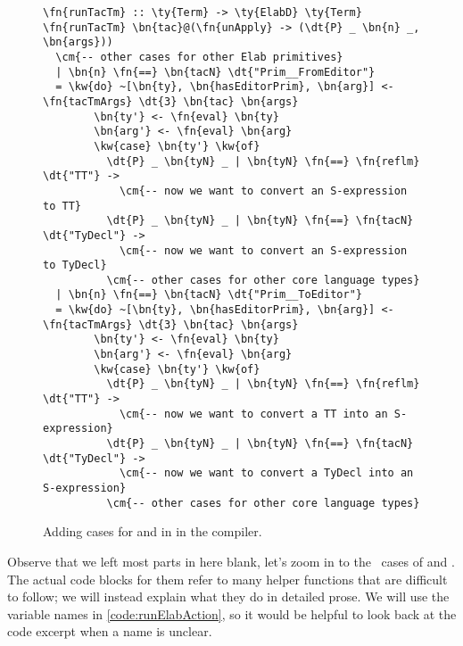 \begin{figure}[H]
\caption{Adding cases for  and  in  in the compiler.}
\label{code:runElabAction}
\begin{Verbatim}[framesep=2mm, label=\footnotesize{\normalfont{Haskell}}, labelposition=topline]
\fn{runTacTm} :: \ty{Term} -> \ty{ElabD} \ty{Term}
\fn{runTacTm} \bn{tac}@(\fn{unApply} -> (\dt{P} _ \bn{n} _, \bn{args}))
  \cm{-- other cases for other Elab primitives}
  | \bn{n} \fn{==} \bn{tacN} \dt{"Prim__FromEditor"}
  = \kw{do} ~[\bn{ty}, \bn{hasEditorPrim}, \bn{arg}] <- \fn{tacTmArgs} \dt{3} \bn{tac} \bn{args}
        \bn{ty'} <- \fn{eval} \bn{ty}
        \bn{arg'} <- \fn{eval} \bn{arg}
        \kw{case} \bn{ty'} \kw{of}
          \dt{P} _ \bn{tyN} _ | \bn{tyN} \fn{==} \fn{reflm} \dt{"TT"} ->
            \cm{-- now we want to convert an S-expression to TT}
          \dt{P} _ \bn{tyN} _ | \bn{tyN} \fn{==} \fn{tacN} \dt{"TyDecl"} ->
            \cm{-- now we want to convert an S-expression to TyDecl}
          \cm{-- other cases for other core language types}
  | \bn{n} \fn{==} \bn{tacN} \dt{"Prim__ToEditor"}
  = \kw{do} ~[\bn{ty}, \bn{hasEditorPrim}, \bn{arg}] <- \fn{tacTmArgs} \dt{3} \bn{tac} \bn{args}
        \bn{ty'} <- \fn{eval} \bn{ty}
        \bn{arg'} <- \fn{eval} \bn{arg}
        \kw{case} \bn{ty'} \kw{of}
          \dt{P} _ \bn{tyN} _ | \bn{tyN} \fn{==} \fn{reflm} \dt{"TT"} ->
            \cm{-- now we want to convert a TT into an S-expression}
          \dt{P} _ \bn{tyN} _ | \bn{tyN} \fn{==} \fn{tacN} \dt{"TyDecl"} ->
            \cm{-- now we want to convert a TyDecl into an S-expression}
          \cm{-- other cases for other core language types}
\end{Verbatim}
\end{figure}

Observe that we left most parts in here blank, let's zoom in to the \TT\ cases
  of  and . The actual code blocks
  for them refer to many helper functions that are difficult to follow; we will
  instead explain what they do in detailed prose. We will use the variable
  names in \autoref{code:runElabAction}, so it would be helpful to look back
  at the code excerpt when a name is unclear.

